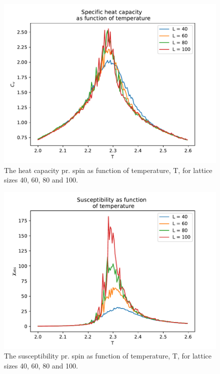 \documentclass[12pt,english,a4paper]{article}
\newcommand*{\figuretitle}[1]{%
    {\centering%
    \textbf{#1}%
    \par}%
}
\begin{document}
\begin{figure}[H]
    \centering
    \includegraphics[scale=0.7]{Figures/Cv_of_T_mpi_2_2_6.pdf}
    \caption{The heat capacity pr. spin as function of temperature, T, for lattice sizes 40, 60, 80 and 100.}
    \label{fig:Cv_of_T}
\end{figure}
\begin{figure}[H]
    \centering
    \includegraphics[scale=0.7]{Figures/Xabs_of_T_mpi_2_2_6.pdf}
    \caption{The susceptibility pr. spin as function of temperature, T, for lattice sizes 40, 60, 80 and 100.}
    \label{fig:X_of_T}
\end{figure}
\end{document}
